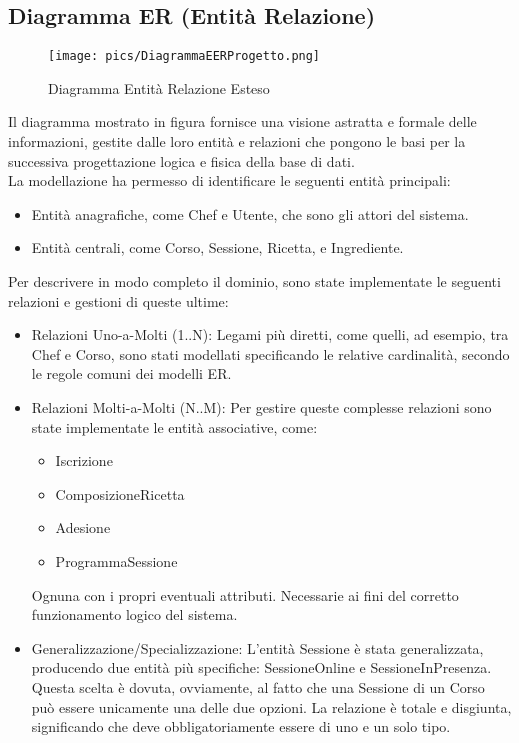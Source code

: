 \documentclass[a4paper, 12pt]{article}
\begin{document}
    \newpage
    \subsection{Diagramma ER (Entità Relazione)}
    \begin{figure}[H]
        \centering
        \texttt{[image: pics/DiagrammaEERProgetto.png]}
        \caption{\label{fig:DiagrammaEERProgetto}Diagramma Entità Relazione Esteso}
    \end{figure}

    Il diagramma mostrato in figura fornisce una visione astratta e formale delle informazioni, gestite dalle loro entità e relazioni che pongono le basi per la successiva progettazione logica e fisica della base di dati.\\[0.3cm]
    La modellazione ha permesso di identificare le seguenti entità principali:
    \begin{itemize}
        \item Entità anagrafiche, come Chef e Utente, che sono gli attori del sistema.
        \item Entità centrali, come Corso, Sessione, Ricetta, e Ingrediente.
    \end{itemize}
    Per descrivere in modo completo il dominio, sono state implementate le seguenti relazioni e gestioni di queste ultime:
    \begin{itemize}
        \item Relazioni Uno-a-Molti (1..N): Legami più diretti, come quelli, ad esempio, tra Chef e Corso, sono stati modellati specificando le relative cardinalità, secondo le regole comuni dei modelli ER.
        \item Relazioni Molti-a-Molti (N..M): Per gestire queste complesse relazioni sono state implementate le entità associative, come:
            \begin{itemize}
                \item Iscrizione
                \item ComposizioneRicetta
                \item Adesione
                \item ProgrammaSessione
            \end{itemize}
        Ognuna con i propri eventuali attributi. Necessarie ai fini del corretto funzionamento logico del sistema.
        \item Generalizzazione/Specializzazione: L'entità Sessione è stata generalizzata, producendo due entità più specifiche: SessioneOnline e SessioneInPresenza. Questa scelta è dovuta, ovviamente, al fatto che una Sessione di un Corso può essere unicamente una delle due opzioni. La relazione è totale e disgiunta, significando che deve obbligatoriamente essere di uno e un solo tipo.
    \end{itemize}
\end{document}
